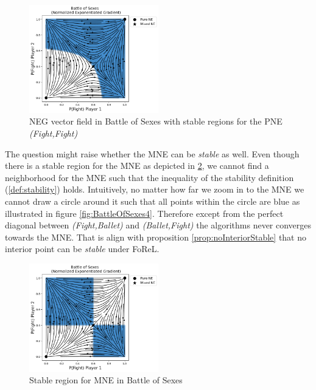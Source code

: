\begin{figure}[H]
    \centering
    \includegraphics[width=0.5\textwidth]{logos/BattleOfSexes2.png}
    \caption{NEG vector field in Battle of Sexes with stable regions for the PNE \textit{(Fight,Fight)}}
    \label{fig:BattleOfSexes2}
\end{figure}

The question might raise whether the MNE can be \textit{stable} as well. Even though there is a stable region for the MNE as depicted in \ref{fig:BattleOfSexes3}, we cannot find a neighborhood for the MNE such that the inequality of the stability definition (\ref{def:stability}) holds. Intuitively, no matter how far we zoom in to the MNE we cannot draw a circle around it such that all points within the circle are blue as illustrated in figure \ref{fig:BattleOfSexes4}. Therefore except from the perfect diagonal between \textit{(Fight,Ballet)} and \textit{(Ballet,Fight)} the algorithms never converges towards the MNE. That is align with proposition \ref{prop:noInteriorStable} that no interior point can be \textit{stable} under FoReL.  

\begin{figure}[H]
    \centering
    \includegraphics[width=0.5\textwidth]{logos/BattleOfSexes3.png}
    \caption{Stable region for MNE in Battle of Sexes}
    \label{fig:BattleOfSexes3}
\end{figure}

